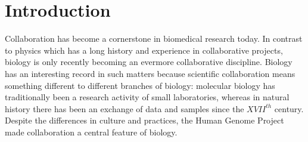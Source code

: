\documentclass{bmcart}
\begin{document}
\begin{frontmatter}
\begin{abstractbox}
\begin{keyword}
\end{keyword}


\end{abstractbox}
%

\end{frontmatter}




\section*{Introduction}

Collaboration has become a cornerstone in biomedical research today.
In contrast to physics which has a long history and experience in
collaborative projects, biology is only recently becoming an evermore
collaborative discipline\cite{VermeulenPenders:2013}. Biology has an
interesting record in such matters because scientific collaboration
means something different to different branches of biology: molecular
biology has traditionally been a research activity of small
laboratories\cite{KnorrCetina:1999,Strasser:2006}, whereas in natural
history there has been an exchange of data and samples since the $XVII^{th}$
century\cite{MullerWille-etal:2012,Strasser:2012}. Despite the differences in
culture and practices, the Human Genome Project made collaboration a
central feature of biology.\\
\end{document}
